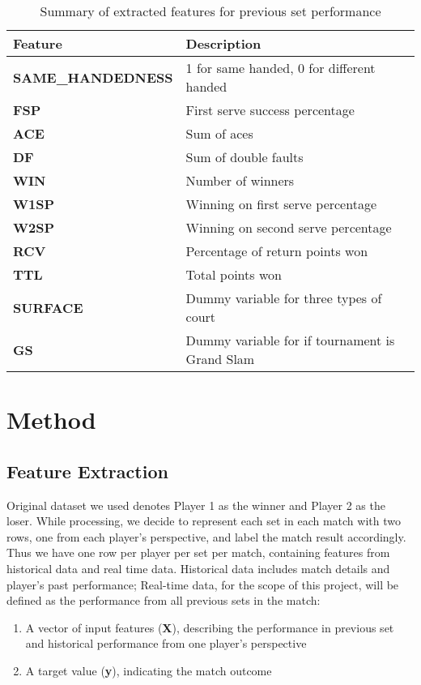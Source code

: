 \documentclass[paper=a4, fontsize=11pt]{scrartcl} %
\numberwithin{equation}{section} %
\numberwithin{figure}{section} %
\numberwithin{table}{section} %
\begin{document}
\begin{center}
\begin{table}[h]
    \begin{tabular}{  l | p{3.3cm} }
    \hline
    Feature  & Description \\ \hline
    \textbf{SAME\_HANDEDNESS}  & 1 for same handed, 0 for different handed \\ \hline
    \textbf{FSP}  & First serve success percentage \\ \hline
    \textbf{ACE}  & Sum of aces \\ \hline
    \textbf{DF}  & Sum of double faults \\ \hline
    \textbf{WIN}  & Number of winners \\ \hline
    \textbf{W1SP}  & Winning on first serve percentage \\ \hline
    \textbf{W2SP}  & Winning on second serve percentage \\ \hline
    \textbf{RCV}  & Percentage of return points won \\ \hline
    \textbf{TTL}  & Total points won \\ \hline
    \textbf{SURFACE}  & Dummy variable for three types of court\\ \hline
    \textbf{GS} & Dummy variable for if tournament is Grand Slam \\ \hline    
    \end{tabular}
    \caption{Summary of extracted features for previous set performance}
    \label{tab:features2}
    \end{table}
\end{center}

\section{Method}
\subsection{Feature Extraction}
\label{sec:label}
Original dataset we used denotes Player 1 as the winner and Player 2 as the loser. While processing, we decide to represent each set in each match with two rows, one from each player's perspective, and label the match result accordingly. Thus we have one row per player per set per match, containing features from historical data and real time data. Historical data includes match details and player's past performance; Real-time data, for the scope of this project, will be defined as the performance from all previous sets in the match:
\begin{enumerate}
\item A vector of input features (\textbf{X}), describing the performance in previous set and historical performance from one player's perspective
\item A target value (\textbf{y}), indicating the match outcome
\end{enumerate}
\end{document}
